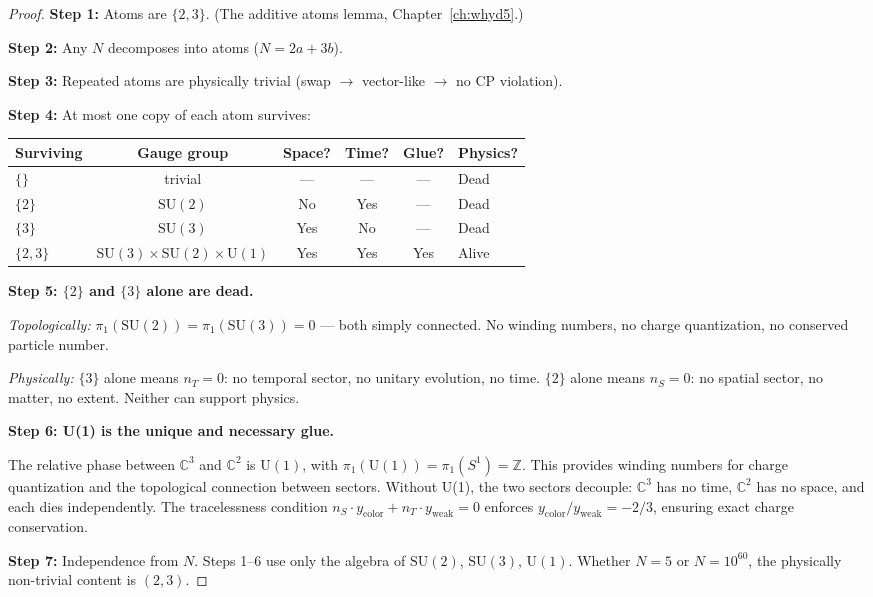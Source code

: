 \documentclass[12pt]{article}
\theoremstyle{remark}
\theoremstyle{definition}
\newcommand{\CC}{\mathbb{C}}
\begin{document}
\begin{proof}
\textbf{Step 1:} Atoms are $\{2, 3\}$. (The additive atoms lemma, Chapter~\ref{ch:whyd5}.)

\textbf{Step 2:} Any $N$ decomposes into atoms ($N = 2a + 3b$).

\textbf{Step 3:} Repeated atoms are physically trivial (swap $\to$ vector-like $\to$ no CP violation).

\textbf{Step 4:} At most one copy of each atom survives:

\begin{center}
\begin{tabular}{lccccl}
\hline
Surviving & Gauge group & Space? & Time? & Glue? & Physics? \\
\hline
$\{\}$ & trivial & --- & --- & --- & Dead \\
$\{2\}$ & $\text{SU}(2)$ & No & Yes & --- & Dead \\
$\{3\}$ & $\text{SU}(3)$ & Yes & No & --- & Dead \\
$\{2, 3\}$ & $\text{SU}(3)\!\times\!\text{SU}(2)\!\times\!\text{U}(1)$ & Yes & Yes & Yes & Alive \\
\hline
\end{tabular}
\end{center}

\textbf{Step 5: $\{2\}$ and $\{3\}$ alone are dead.}

\emph{Topologically:} $\pi_1(\text{SU}(2)) = \pi_1(\text{SU}(3)) = 0$ --- both simply connected. No winding numbers, no charge quantization, no conserved particle number.

\emph{Physically:} $\{3\}$ alone means $n_T = 0$: no temporal sector, no unitary evolution, no time. $\{2\}$ alone means $n_S = 0$: no spatial sector, no matter, no extent. Neither can support physics.

\textbf{Step 6: U(1) is the unique and necessary glue.}

The relative phase between $\CC^3$ and $\CC^2$ is $\text{U}(1)$, with $\pi_1(\text{U}(1)) = \pi_1(S^1) = \mathbb{Z}$. This provides winding numbers for charge quantization and the topological connection between sectors. Without U(1), the two sectors decouple: $\CC^3$ has no time, $\CC^2$ has no space, and each dies independently. The tracelessness condition $n_S \cdot y_\text{color} + n_T \cdot y_\text{weak} = 0$ enforces $y_\text{color}/y_\text{weak} = -2/3$, ensuring exact charge conservation.

\textbf{Step 7:} Independence from $N$. Steps 1--6 use only the algebra of $\text{SU}(2)$, $\text{SU}(3)$, $\text{U}(1)$. Whether $N = 5$ or $N = 10^{60}$, the physically non-trivial content is $(2, 3)$.
\end{proof}
\end{document}
